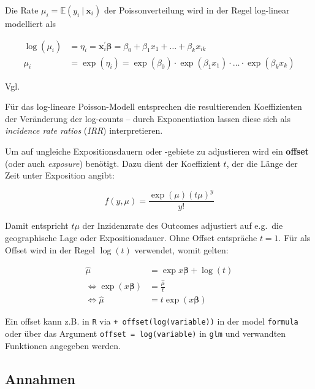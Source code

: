 \documentclass[ngerman,a4paper,]{scrartcl}
\theoremstyle{definition}
\theoremstyle{definition}
\theoremstyle{definition}
\theoremstyle{remark}
\begin{document}
Die Rate \(\mu_i = \mathbb{E}(y_i\ |\ \mathbf{x}_i)\) der Poissonverteilung wird in der Regel log-linear modelliert als

\begin{align*}
  \log(\mu_i) &= \eta_i 
    = \mathbf{x}_i^\prime \boldsymbol{\beta} 
    = \beta_0 + \beta_1 x_1 + \ldots + \beta_k x_{ik} \\
  \mu_i &= \exp(\eta_i) 
    = \exp(\beta_0) \cdot \exp(\beta_1 x_1) \cdot \ldots \cdot \exp(\beta_k x_k)
\end{align*}

Vgl. \citet{fahrmeirRegressionModelleMethoden2009}

Für das log-lineare Poisson-Modell entsprechen die resultierenden Koeffizienten der Veränderung der log-counts -- durch Exponentiation lassen diese sich als \emph{incidence rate ratios} (\emph{IRR}) interpretieren.

Um auf ungleiche Expositionsdauern oder -gebiete zu adjustieren wird ein \textbf{offset} (oder auch \emph{exposure}) benötigt. Dazu dient der Koeffizient \(t\), der die Länge der Zeit unter Exposition angibt:

\begin{equation}
f(y, \mu) = \frac{\exp(\mu) (t \mu)^y}{y!}
\end{equation}

Damit entspricht \(t \mu\) der Inzidenzrate des Outcomes adjustiert auf e.g.~die geographische Lage oder Expositionsdauer. Ohne Offset entspräche \(t = 1\).
Für als Offset wird in der Regel \(\log(t)\) verwendet, womit gelten:

\begin{align*}
\hat{\mu} &= \exp{x \boldsymbol{\beta} + \log(t)} \\
\Leftrightarrow \exp(x \boldsymbol{\beta}) &= \frac{\hat{\mu}}{t} \\
\Leftrightarrow \hat{\mu} &= t \exp(x \boldsymbol{\beta})
\end{align*}

Ein offset kann z.B. in \texttt{R} via \texttt{+\ offset(log(variable))} in der model \texttt{formula} oder über das Argument \texttt{offset\ =\ log(variable)} in \texttt{glm} und verwandten Funktionen angegeben werden.

\hypertarget{annahmen}{%
\subsection{Annahmen}\label{annahmen}}
\end{document}
